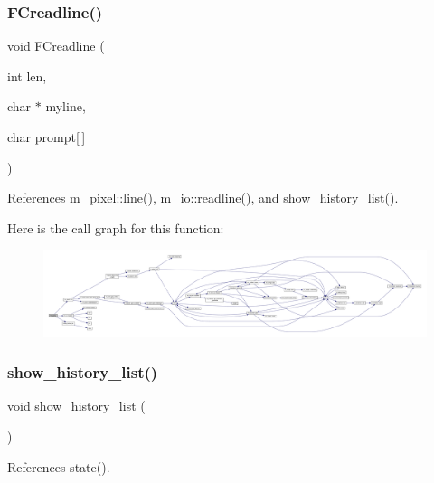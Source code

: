 \subsubsection{\texorpdfstring{F\+Creadline()}{FCreadline()}}
{\footnotesize\ttfamily void F\+Creadline (\begin{DoxyParamCaption}\item[{int}]{len,  }\item[{char $\ast$}]{myline,  }\item[{char}]{prompt\mbox{[}$\,$\mbox{]} }\end{DoxyParamCaption})}



References m\+\_\+pixel\+::line(), m\+\_\+io\+::readline(), and show\+\_\+history\+\_\+list().

Here is the call graph for this function\+:
\nopagebreak
\begin{figure}[H]
\begin{center}
\leavevmode
\includegraphics[width=350pt]{C-M__readline_8c_a146edc06a54e833494378446131c6bcd_cgraph}
\end{center}
\end{figure}
\mbox{\label{C-M__readline_8c_a80269900528c2ee04bf7cacb3a07ff40}} 
\subsubsection{\texorpdfstring{show\+\_\+history\+\_\+list()}{show\_history\_list()}}
{\footnotesize\ttfamily void show\+\_\+history\+\_\+list (\begin{DoxyParamCaption}{ }\end{DoxyParamCaption})}



References state().

